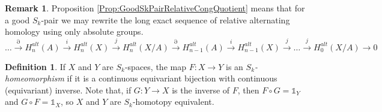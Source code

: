 \documentclass[11pt,a4paper,twoside]{article}
\theoremstyle{plain}
\theoremstyle{definition}
\newtheorem{defn}[thm]{Definition}
\theoremstyle{definition}
\theoremstyle{definition}
\theoremstyle{definition}
\theoremstyle{definition}
\newtheorem*{remark}{Remark}
\begin{document}
\begin{remark}
Proposition \ref{Prop:GoodSkPairRelativeCongQuotient} means that for a good $S_k$-pair we may rewrite the long exact sequence of relative alternating homology using only absolute groups.
$$\dots\!\overset\partial\rightarrow\! H_n^{alt}(A)\!\overset i\longrightarrow\! H_n^{alt}(X)\!\overset j\longrightarrow\! H_n^{alt}(X/A)\!\overset\partial\longrightarrow\! H_{n\!-\!1}^{alt}(A)\!\overset i\longrightarrow\! H_{n\!-\!1}^{alt}(X)\!\overset j\rightarrow\!\dots\!\overset j\rightarrow\! H_0^{alt}(X/A)\!\rightarrow\!0$$
\end{remark}

\begin{defn}
If $X$ and $Y$ are $S_k$-spaces, the map $F\!:\!X\longrightarrow Y$ is an \emph{$S_k$-homeomorphism} if it is a continuous equivariant bijection with continuous (equivariant) inverse. Note that, if $G\!:\!Y\longrightarrow X$ is the inverse of $F$, then $F\circ G=\mathbb{1}_Y$ and $G\circ F=\mathbb{1}_X$, so $X$ and $Y$ are $S_k$-homotopy equivalent.
\end{defn}
\end{document}
